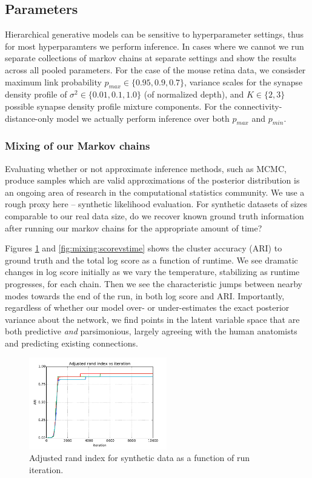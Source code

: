 \documentclass{article}
\begin{document}
\subsection*{Parameters}

Hierarchical generative models can be sensitive to hyperparameter
settings, thus for most hyperparamters we perform inference. In cases
where we cannot we run separate collections of markov chains at
separate settings and show the results across all pooled
parameters. For the case of the mouse retina data, we consisder
maximum link probability $p_{max} \in \{0.95, 0.9, 0.7\}$, variance
scales for the synapse density profile of $\sigma^2 \in \{0.01, 0.1,
1.0\}$ (of normalized depth), and $K \in \{2, 3\}$ possible synapse
density profile mixture components. For the connectivity-distance-only
model we actually perform inference over both $p_{max}$ and $p_{min}$.


\subsubsection*{Mixing of our Markov chains} 
Evaluating whether or not approximate inference methods, such as MCMC,
produce samples which are valid approximations of the posterior
distribution is an ongoing area of research in the computational
statistics community. We use a rough proxy here -- synthetic
likelihood evaluation.  For synthetic datasets of sizes comparable to
our real data size, do we recover known ground truth information after
running our markov chains for the appropriate amount of time?

Figures \ref{fig:mixing:ari} and \ref{fig:mixing:scorevstime} shows
the cluster accuracy (ARI) to ground truth and the total log score as a function of
runtime.  We see dramatic changes in log score initially as we vary
the temperature, stabilizing as runtime progresses, for each
chain. Then we see the characteristic jumps between nearby modes
towards the end of the run, in both log score and ARI.  Importantly,
regardless of whether our model over- or under-estimates the exact
posterior variance about the network, we find points in the latent
variable space that are both predictive \textit{and} parsimonious,
largely agreeing with the human anatomists and predicting existing
connections.

\begin{figure}
  \centering 
  \centerline{\includegraphics[width=60mm]{mixing.ari.pdf}}
  \caption{Adjusted rand index for synthetic data as a function of run iteration. }
\label{fig:mixing:ari}
\end{figure}
\end{document}

